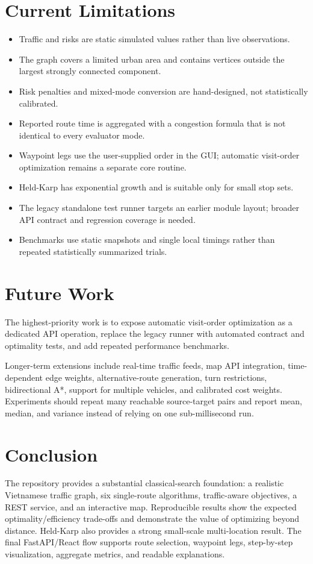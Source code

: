 \documentclass[12pt,a4paper,oneside]{report}
\begin{document}
\section{Current Limitations}
\begin{itemize}
\item Traffic and risks are static simulated values rather than live observations.
\item The graph covers a limited urban area and contains vertices outside the largest strongly connected component.
\item Risk penalties and mixed-mode conversion are hand-designed, not statistically calibrated.
\item Reported route time is aggregated with a congestion formula that is not identical to every evaluator mode.
\item Waypoint legs use the user-supplied order in the GUI; automatic visit-order optimization remains a separate core routine.
\item Held-Karp has exponential growth and is suitable only for small stop sets.
\item The legacy standalone test runner targets an earlier module layout; broader API contract and regression coverage is needed.
\item Benchmarks use static snapshots and single local timings rather than repeated statistically summarized trials.
\end{itemize}

\section{Future Work}
The highest-priority work is to expose automatic visit-order optimization as a
dedicated API operation, replace the legacy runner with automated contract and
optimality tests, and add repeated performance benchmarks.

Longer-term extensions include real-time traffic feeds, map API integration,
time-dependent edge weights, alternative-route generation, turn restrictions,
bidirectional A*, support for multiple vehicles, and calibrated cost weights.
Experiments should repeat many reachable source-target pairs and report mean,
median, and variance instead of relying on one sub-millisecond run.

\section{Conclusion}
The repository provides a substantial classical-search foundation: a realistic
Vietnamese traffic graph, six single-route algorithms, traffic-aware objectives,
a REST service, and an interactive map. Reproducible results show the expected
optimality/efficiency trade-offs and demonstrate the value of optimizing beyond
distance. Held-Karp also provides a strong small-scale multi-location result.
The final FastAPI/React flow supports route selection, waypoint legs,
step-by-step visualization, aggregate metrics, and readable explanations.
\end{document}
